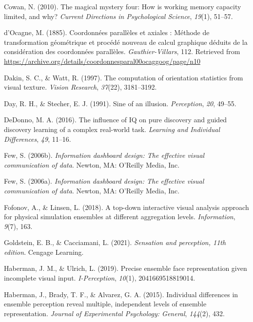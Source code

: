 \documentclass[print]{nuthesis}
\newlength{\cslhangindent}
\newenvironment{CSLReferences}[2]%
{\setlength{\parindent}{0pt}%
\everypar{\setlength{\hangindent}{\cslhangindent}}\ignorespaces}%
{\par}
\begin{document}
\begin{CSLReferences}{1}{0}
\leavevmode{}%
Cowan, N. (2010). The magical mystery four: How is working memory capacity limited, and why? \emph{Current Directions in Psychological Science}, \emph{19}(1), 51--57.

\leavevmode{}%
d'Ocagne, M. (1885). {Coordonnées parallèles et axiales : Méthode de transformation géométrique et procédé nouveau de calcul graphique déduits de la considération des coordonnées parallèles}. \emph{Gauthier-Villars}, 112. Retrieved from \url{https://archive.org/details/coordonnesparal00ocaggoog/page/n10}

\leavevmode{}%
Dakin, S. C., \& Watt, R. (1997). The computation of orientation statistics from visual texture. \emph{Vision Research}, \emph{37}(22), 3181--3192.

\leavevmode{}%
Day, R. H., \& Stecher, E. J. (1991). Sine of an illusion. \emph{Perception}, \emph{20}, 49--55.

\leavevmode{}%
DeDonno, M. A. (2016). The influence of IQ on pure discovery and guided discovery learning of a complex real-world task. \emph{Learning and Individual Differences}, \emph{49}, 11--16.

\leavevmode{}%
Few, S. (2006b). \emph{Information dashboard design: The effective visual communication of data}. Newton, MA: O'Reilly Media, Inc.

\leavevmode{}%
Few, S. (2006a). \emph{Information dashboard design: The effective visual communication of data}. Newton, MA: O'Reilly Media, Inc.

\leavevmode{}%
Fofonov, A., \& Linsen, L. (2018). A top-down interactive visual analysis approach for physical simulation ensembles at different aggregation levels. \emph{Information}, \emph{9}(7), 163.

\leavevmode{}%
Goldstein, E. B., \& Cacciamani, L. (2021). \emph{Sensation and perception, 11th edition}. Cengage Learning.

\leavevmode{}%
Haberman, J. M., \& Ulrich, L. (2019). Precise ensemble face representation given incomplete visual input. \emph{I-Perception}, \emph{10}(1), 2041669518819014.

\leavevmode{}%
Haberman, J., Brady, T. F., \& Alvarez, G. A. (2015). Individual differences in ensemble perception reveal multiple, independent levels of ensemble representation. \emph{Journal of Experimental Psychology: General}, \emph{144}(2), 432.


\end{CSLReferences}
\end{document}
